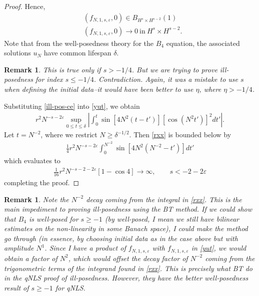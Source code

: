 \documentclass[12pt,reqno]{amsart}
\numberwithin{equation}{section}  %
\newcommand{\ee}{\varepsilon}
\newtheorem{remark}[theorem]{Remark}
\begin{document}
\begin{proof}
%
Hence, 
\begin{equation*}
  \begin{split}
    & (f_{N,1,s, \ee}, 0) \in B_{H^{s} \times H^{s-2}}(1)
    \\
    & (f_{N,1, s, \ee}, 0) \to 0 \ \text{in} \ H^{s} \times H^{s-2}.
  \end{split}
\end{equation*}
Note that from the well-posedness theory for the $B_{4}$ equation,
the associated solutions $u_{N}$ have common lifespan $\delta$. 
\begin{framed}
  \begin{remark}
  This is true only if $s > -1/4$. But we are trying to prove ill-posedness for
  index $s \le -1/4$. Contradiction.
  Again, it was a mistake to use $s$ when defining the
  initial data--it would have been better to use $\eta$, where $\eta > -1/4$. 
  \end{remark}
\end{framed}
Substituting
\eqref{ill-pos-ce} into \eqref{yut}, we obtain
%
%
\begin{equation}
  \label{rxx}
\begin{split}
  r^{2}N^{-s -2 \ee} \sup_{0 \le t \le \delta} 
  | \int_{0}^{t} \sin[4N^{2}(t-t')] [\cos(N^{2}t')]^{2} dt' |.
\end{split}
\end{equation}
%
Let $t = N^{-2}$, where we restrict $N \ge
\delta^{-1/2}$. Then \eqref{rxx} is bounded below by
%
%
%
%
\begin{equation*}
\begin{split}
\frac{1}{4} r^{2}N^{-s -2 \ee}  
\int_{0}^{N^{-2}} \sin[4N^{2}(N^{-2}-t')] dt'
\end{split}
\end{equation*}
%
%
which evaluates to
%
%
\begin{equation*}
\begin{split}
\frac{1}{16} r^{2} N^{-s -2 -2 \ee}  
[1 - \cos 4]  \to \infty, \qquad s < -2 -2\ee
\end{split}
\end{equation*}
%
%
completing the proof.  
\end{proof}
%
%
%
\begin{framed}
%
%
\begin{remark}
  Note the $N^{-2}$ decay coming from the integral in \eqref{rxx}. This is
  the main impediment to proving ill-posedness using the BT method.
  If we could show that $B_{4}$ is well-posed for $s \ge -1$ (by
  well-posed, I mean we still have bilinear estimates on the non-linearity in
  some Banach space), I
  could make the method go through (in essence, by choosing initial data as
  in the case above but with amplitude $N^{1}$. Since I have a product of
  $f_{N,1,s,\ee}$ with $f_{N,1,s,\ee}$ in \eqref{yut}, we would obtain a factor of
  $N^{2}$, which would offset the decay
  factor of $N^{-2}$ coming from the trigonometric terms of the integrand found
  in \eqref{rxx}. This is precisely what BT do in the qNLS proof of
  ill-posedness. However, they have the better well-posedness result of $s \ge
  -1$ for qNLS.
\label{rem:extra-decay}
\end{remark}
%
%
\end{framed}
\end{document}
